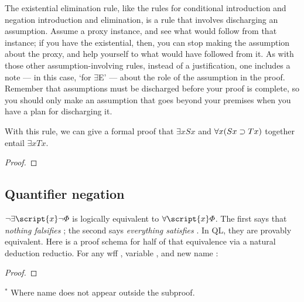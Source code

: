 The existential elimination rule, like the rules for conditional introduction and negation introduction and elimination, is a rule that involves discharging an assumption. Assume a proxy instance, and see what would follow from that instance; if you have the existential, then, you can stop making the assumption about the proxy, and help yourself to what would have followed from it. As with those other assumption-involving rules, instead of a justification, one includes a note --- in this case, `for $\exists${}E' --- about the role of the assumption in the proof. Remember that assumptions must be discharged before your proof is complete, so you should only make an assumption that goes beyond your premises when you have a plan for discharging it.


With this rule, we can give a formal proof that $\exists x Sx$ and $\forall x(Sx \supset Tx)$ together entail $\exists x Tx$.

\begin{proof}
	\open
		 
	\close
\end{proof}

\subsection{Quantifier negation}

$\enot\exists \script{x}\enot\metaA{}$ is logically equivalent to $\forall \script{x}\metaA{}$. The first says that \emph{nothing falsifies} \metaA{}; the second says \emph{everything satisfies} \metaA{}. In QL, they are provably equivalent. Here is a proof schema for half of that equivalence via a natural deduction reductio. For any wff \metaA{}, variable , and new name :


\begin{proof}
	 
	\open
		\open
			\open
			\close
		\close
		\close
\end{proof}
$^\ast$ Where name  does not appear outside the subproof.

